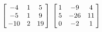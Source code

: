 {$\left[\hskip -3pt \begin{array}{ccc} -4&1&5\\  -5&1&9
\\  -10&2&19\end{array}\hskip -3pt \right]$ 
}
{$\left[\hskip -3pt \begin{array}{ccc} 1&-9&4\\  5&-26&11
\\  0&-2&1\end{array}\hskip -3pt \right]$}
